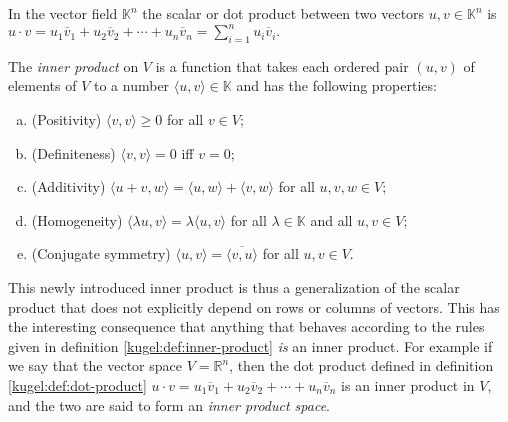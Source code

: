 \begin{definition}
  \label{kugel:def:dot-product}
  In the vector field \(\mathbb{K}^n\) the scalar or dot product between two
  vectors \(u, v \in \mathbb{K}^n\) is
  \(
    u \cdot v 
    = u_1 \overline{v}_1 + u_2 \overline{v}_2 + \cdots + u_n \overline{v}_n
    = \sum_{i=1}^n u_i \overline{v}_i.
  \)
\end{definition}


\begin{definition}[Span]
\end{definition}


\begin{definition}
\end{definition}



\begin{definition}[Basis]
\end{definition}


\begin{definition}
  \label{kugel:def:inner-product} \nocite{axler_linear_2014}
  The \emph{inner product} on \(V\) is a function that takes each ordered pair
  \((u, v)\) of elements of \(V\) to a number \(\langle u, v \rangle \in
  \mathbb{K}\) and has the following properties:
  \begin{enumerate}[(a)]
    \item (Positivity) \(\langle v, v \rangle \geq 0\) for all \(v \in V\);
    \item (Definiteness) \(\langle v, v \rangle = 0\) iff \(v = 0\);
    \item (Additivity) \(
        \langle u + v, w \rangle =
        \langle u, w \rangle + \langle v, w \rangle
      \) for all \(u, v, w \in V\);
    \item (Homogeneity) \(
        \langle \lambda u, v \rangle =
        \lambda \langle u, v \rangle
      \) for all \(\lambda \in \mathbb{K}\) and all \(u, v \in V\);
    \item (Conjugate symmetry)
      \(\langle u, v \rangle = \overline{\langle v, u \rangle}\) for all
      \(u, v \in V\).
  \end{enumerate}
\end{definition}

This newly introduced inner product is thus a generalization of the scalar
product that does not explicitly depend on rows or columns of vectors. This
has the interesting consequence that anything that behaves according to the
rules given in definition \ref{kugel:def:inner-product} \emph{is} an inner
product. For example if we say that the vector space \(V = \mathbb{R}^n\),
then the dot product defined in definition \ref{kugel:def:dot-product}
\(
  u \cdot v = u_1 \overline{v}_1 + u_2 \overline{v}_2 + \cdots + u_n \overline{v}_n
\)
is an inner product in \(V\), and the two are said to form an \emph{inner
product space}.

